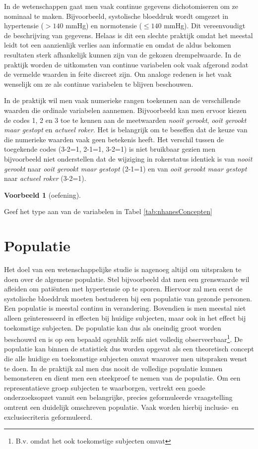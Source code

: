 \documentclass[
  12pt,dutch,coursenotes]{book}
\theoremstyle{definition}
\theoremstyle{definition}
\newtheorem{example}{Voorbeeld}[chapter]
\theoremstyle{definition}
\theoremstyle{remark}
\begin{document}
In de wetenschappen gaat men vaak continue
gegevens dichotomiseren om ze nominaal te maken. Bijvoorbeeld, systolische
bloeddruk wordt omgezet in hypertensie (\(>140\) mmHg) en normotensie (\(\leq 140\)
mmHg). Dit vereenvoudigt de beschrijving van gegevens. Helaas is dit een
slechte praktijk omdat het meestal leidt tot een aanzienlijk verlies aan informatie en
omdat de aldus bekomen resultaten sterk afhankelijk kunnen zijn van de
gekozen drempelwaarde. In de praktijk worden de uitkomsten van continue
variabelen ook vaak afgerond zodat de vermelde waarden in feite discreet
zijn. Om analoge redenen is het vaak wenselijk om ze als continue variabelen
te blijven beschouwen.

In de praktijk wil men vaak numerieke rangen toekennen aan de verschillende
waarden die ordinale variabelen aannemen. Bijvoorbeeld kan men ervoor kiezen
de codes 1, 2 en 3 toe te kennen aan de meetwaarden \emph{nooit gerookt}, \emph{ooit gerookt maar gestopt} en \emph{actueel roker}.
Het is belangrijk om te beseffen dat de keuze van die numerieke waarden vaak geen betekenis heeft.
Het verschil tussen de toegekende codes (3-2=1, 2-1=1, 3-2=1) is niet bruikbaar gezien men bijvoorbeeld niet onderstellen dat de wijziging in rokerstatus identiek is van \emph{nooit gerookt} naar \emph{ooit gerookt maar gestopt} (2-1=1) en van \emph{ooit gerookt maar gestopt} naar \emph{actueel roker} (3-2=1).

\begin{example}[oefening]
\protect\hypertarget{exm:unnamed-chunk-30}{}{\label{exm:unnamed-chunk-30} \iffalse (oefening) \fi{} }
\end{example}
Geef het type aan van de variabelen in Tabel \ref{tab:nhanesConcepten}

\hypertarget{subsec:pop}{%
\section{Populatie}\label{subsec:pop}}

Het doel van een wetenschappelijke studie is nagenoeg altijd om uitspraken te doen over de algemene populatie.
Stel bijvoorbeeld dat men een grenswaarde wil afleiden om patiënten met hypertensie op te sporen.
Hiervoor zal men eerst de systolische bloeddruk moeten bestuderen bij een populatie van gezonde personen.
Een populatie is meestal continu in verandering.
Bovendien is men meestal niet alleen geïnteresseerd in effecten bij huidige subjecten, maar ook in het effect bij toekomstige subjecten.
De populatie kan dus als oneindig groot worden beschouwd en is op een bepaald ogenblik zelfs niet volledig observeerbaar\footnote{B.v. omdat het ook toekomstige subjecten omvat}.
De populatie kan binnen de statistiek dus worden opgevat als een theoretisch concept die alle huidige en toekomstige subjecten omvat waarover men uitspraken wenst te doen.
In de praktijk zal men dus nooit de volledige populatie kunnen bemonsteren en dient men een steekproef te nemen van de populatie.
Om een representatieve groep subjecten te waarborgen, vertrekt een goede onderzoeksopzet vanuit een belangrijke, precies geformuleerde vraagstelling
omtrent een duidelijk omschreven populatie.
Vaak worden hierbij inclusie- en exclusiecriteria geformuleerd.
\end{document}
